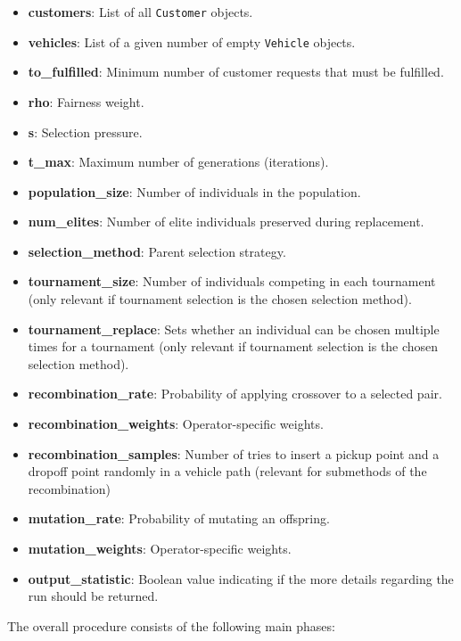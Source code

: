 \documentclass[12pt]{article}
\begin{document}
\begin{itemize}
    \item \textbf{customers}: List of all \texttt{Customer} objects.
    \item \textbf{vehicles}: List of a given number of empty \texttt{Vehicle} objects.
    \item \textbf{to\_fulfilled}: Minimum number of customer requests that must be fulfilled.
    \item \textbf{rho}: Fairness weight.
    \item \textbf{s}: Selection pressure.
    \item \textbf{t\_max}: Maximum number of generations (iterations).
    \item \textbf{population\_size}: Number of individuals in the population.
    \item \textbf{num\_elites}: Number of elite individuals preserved during replacement.
    \item \textbf{selection\_method}: Parent selection strategy.
    \item \textbf{tournament\_size}: Number of individuals competing in each tournament (only relevant if tournament selection is the chosen selection method).
    \item \textbf{tournament\_replace}: Sets whether an individual can be chosen multiple times for a tournament (only relevant if tournament selection is the chosen selection method).
    \item \textbf{recombination\_rate}: Probability of applying crossover to a selected pair.
    \item \textbf{recombination\_weights}: Operator-specific weights.
    \item \textbf{recombination\_samples}: Number of tries to insert a pickup point and a dropoff point randomly in a vehicle path (relevant for submethods of the recombination)
    \item \textbf{mutation\_rate}: Probability of mutating an offspring.
    \item \textbf{mutation\_weights}: Operator-specific weights.
    \item \textbf{output\_statistic}: Boolean value indicating if the more details regarding the run should be returned.
\end{itemize}

\pagebreak


The overall procedure consists of the following main phases:
\end{document}
